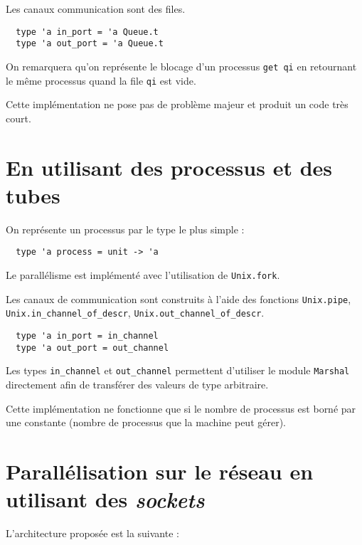 \documentclass[11pt]{article}
\begin{document}
\smallskip

Les canaux communication sont des files.

\begin{lstlisting}
  type 'a in_port = 'a Queue.t
  type 'a out_port = 'a Queue.t
\end{lstlisting}

On remarquera qu'on repr\'esente le blocage d'un processus {\tt get qi}
en retournant le m\^eme processus quand la file {\tt qi} est vide.

\smallskip

Cette impl\'ementation ne pose pas de probl\`eme majeur
et produit un code tr\`es court.

\section{En utilisant des processus et des tubes}

On repr\'esente un processus par le type le plus simple :

\begin{lstlisting}
  type 'a process = unit -> 'a
\end{lstlisting}

Le parall\'elisme est impl\'ement\'e avec l'utilisation de {\tt Unix.fork}.

\smallskip

Les canaux de communication sont construits \`a l'aide des fonctions
{\tt Unix.pipe},
{\tt Unix.in\_channel\_of\_descr}, {\tt Unix.out\_channel\_of\_descr}.

\begin{lstlisting}
  type 'a in_port = in_channel
  type 'a out_port = out_channel
\end{lstlisting}

Les types {\tt in\_channel} et {\tt out\_channel} permettent d'utiliser
le module {\tt Marshal} directement afin de transf\'erer des valeurs
de type arbitraire.

\smallskip

Cette impl\'ementation ne fonctionne que si le nombre de processus est
born\'e par une constante (nombre de processus que la machine peut g\'erer).

\section{Parall\'elisation sur le r\'eseau en utilisant des {\sl sockets}}

L'architecture propos\'ee est la suivante :
\end{document}
